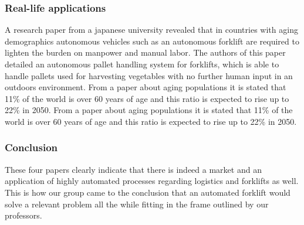 \documentclass[11pt]{article}
\begin{document}
    \subsubsection{Real-life applications}
    A research paper from a japanese university revealed 
    that in countries with aging demographics autonomous 
    vehicles such as an autonomous forklift are required 
    to lighten the burden on manpower and manual labor. 
    The authors of this paper detailed an autonomous pallet 
    handling system for forklifts, which is able to handle 
    pallets used for harvesting vegetables with no further 
    human input in an outdoors environment.
    From a paper about aging populations it is stated that 
    11\% of the world is over 60 years of age and this ratio 
    is expected to rise up to 22\% in 2050.
    From a paper about aging populations it is stated that 
    11\% of the world is over 60 years of age and this ratio 
    is expected to rise up to 22\% in 2050.

    \subsubsection{Conclusion}
    These four papers clearly indicate that there is indeed 
    a market and an application of highly automated processes
    regarding logistics and forklifts as well. This is how
    our group came to the conclusion that an automated
    forklift would solve a relevant problem all the while 
    fitting in the frame outlined by our professors. 
\end{document}
